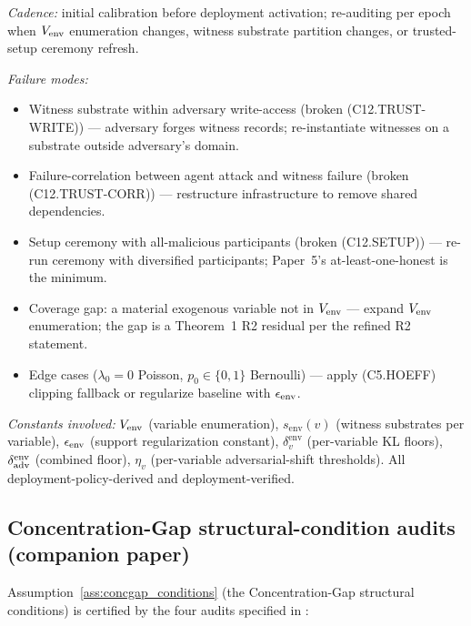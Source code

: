 \emph{Cadence:} initial calibration before deployment activation;
re-auditing per epoch when $V_{\mathrm{env}}$ enumeration changes, witness
substrate partition changes, or trusted-setup ceremony refresh.

\emph{Failure modes:}
\begin{itemize}
\item Witness substrate within adversary write-access (broken
  (C12.TRUST-WRITE)) — adversary forges witness records;
  re-instantiate witnesses on a substrate outside adversary's
  domain.
\item Failure-correlation between agent attack and witness failure
  (broken (C12.TRUST-CORR)) — restructure infrastructure to remove
  shared dependencies.
\item Setup ceremony with all-malicious participants (broken
  (C12.SETUP)) — re-run ceremony with diversified participants;
  Paper~5's at-least-one-honest is the minimum.
\item Coverage gap: a material exogenous variable not in $V_{\mathrm{env}}$ —
  expand $V_{\mathrm{env}}$ enumeration; the gap is a Theorem~1 R2 residual
  per the refined R2 statement.
\item Edge cases ($\lambda_0 = 0$ Poisson, $p_0 \in \{0, 1\}$
  Bernoulli) — apply (C5.HOEFF) clipping fallback or regularize
  baseline with $\epsilon_{\mathrm{env}}$.
\end{itemize}

\emph{Constants involved:} $V_{\mathrm{env}}$ (variable enumeration),
$s_{\mathrm{env}}(v)$ (witness substrates per variable), $\epsilon_{\mathrm{env}}$
(support regularization constant), $\delta_v^{\mathrm{env}}$
(per-variable KL floors), $\delta_{\mathrm{adv}}^{\mathrm{env}}$ (combined
floor), $\eta_v$ (per-variable adversarial-shift thresholds).
All deployment-policy-derived and deployment-verified.

\subsection{Concentration-Gap structural-condition audits (companion paper)}
\label{sec:tooling_concgap_structural}

Assumption~\ref{ass:concgap_conditions} (the
Concentration-Gap structural conditions) is certified by the four
audits specified in \citep[\S 6]{lasser2026foundations}:


